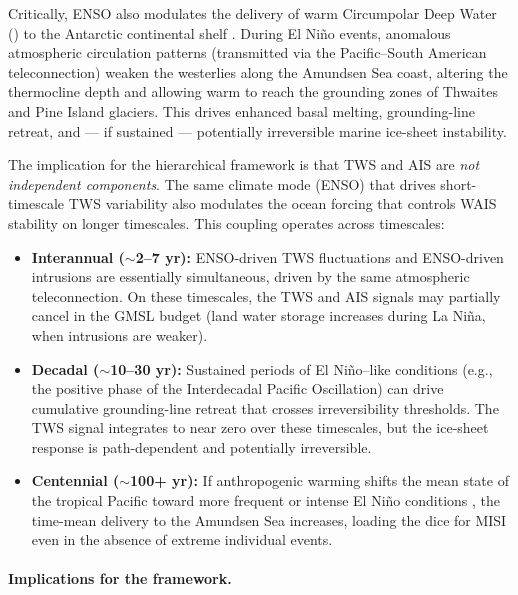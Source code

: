 \documentclass[11pt]{article}
\newcommand{\CDW}{\text{CDW}}
\begin{document}
Critically, ENSO also modulates the delivery of warm Circumpolar Deep Water (\CDW) to the Antarctic continental shelf \citep{steig2012tropical, paolo2018response}.  During El Ni\~no events, anomalous atmospheric circulation patterns (transmitted via the Pacific--South American teleconnection) weaken the westerlies along the Amundsen Sea coast, altering the thermocline depth and allowing warm \CDW{} to reach the grounding zones of Thwaites and Pine Island glaciers.  This drives enhanced basal melting, grounding-line retreat, and --- if sustained --- potentially irreversible marine ice-sheet instability.

The implication for the hierarchical framework is that TWS and AIS are \emph{not independent components}.  The same climate mode (ENSO) that drives short-timescale TWS variability also modulates the ocean forcing that controls WAIS stability on longer timescales.  This coupling operates across timescales:

\begin{itemize}
  \item \textbf{Interannual ($\sim$2--7 yr):} ENSO-driven TWS fluctuations and ENSO-driven \CDW{} intrusions are essentially simultaneous, driven by the same atmospheric teleconnection.  On these timescales, the TWS and AIS signals may partially cancel in the GMSL budget (land water storage increases during La Ni\~na, when \CDW{} intrusions are weaker).

  \item \textbf{Decadal ($\sim$10--30 yr):} Sustained periods of El Ni\~no--like conditions (e.g., the positive phase of the Interdecadal Pacific Oscillation) can drive cumulative grounding-line retreat that crosses irreversibility thresholds.  The TWS signal integrates to near zero over these timescales, but the ice-sheet response is path-dependent and potentially irreversible.

  \item \textbf{Centennial ($\sim$100+ yr):} If anthropogenic warming shifts the mean state of the tropical Pacific toward more frequent or intense El Ni\~no conditions \citep{cai2014increasing}, the time-mean \CDW{} delivery to the Amundsen Sea increases, loading the dice for MISI even in the absence of extreme individual events.
\end{itemize}

\paragraph{Implications for the framework.}
\end{document}
